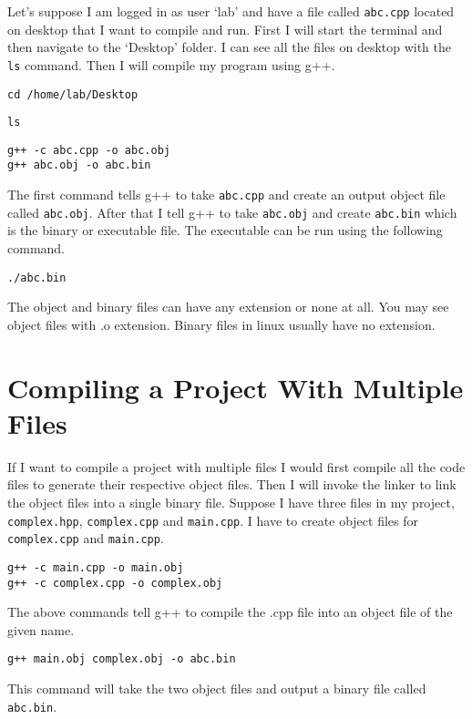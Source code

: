 \documentclass[12pt,a4paper]{article}
\begin{document}
Let's suppose I am logged in as user `lab' and have a file called \verb|abc.cpp| located on desktop that I want to compile and run. First I will start the terminal and then navigate to the `Desktop' folder. I can see all the files on desktop with the \verb|ls| command. Then I will compile my program using g++.
\lstset{breaklines=true, basicstyle=\small\ttfamily, tabsize=4, numbers=none, stepnumber=1, frame=single, showstringspaces=false, upquote=true}
\begin{lstlisting}
cd /home/lab/Desktop
\end{lstlisting}
\begin{lstlisting}
ls
\end{lstlisting}
\begin{lstlisting}
g++ -c abc.cpp -o abc.obj
g++ abc.obj -o abc.bin
\end{lstlisting}
The first command tells g++ to take \verb|abc.cpp| and create an output object file called \verb|abc.obj|. After that I tell g++ to take \verb|abc.obj| and create \verb|abc.bin| which is the binary or executable file. The executable can be run using the following command.
\begin{lstlisting}
./abc.bin
\end{lstlisting}
The object and binary files can have any extension or none at all. You may see object files with .o extension. Binary files in linux usually have no extension.
\section{Compiling a Project With Multiple Files}
If I want to compile a project with multiple files I would first compile all the code files to generate their respective object files. Then I will invoke the linker to link the object files into a single binary file. Suppose I have three files in my project, \verb|complex.hpp|, \verb|complex.cpp| and \verb|main.cpp|. I have to create object files for \verb|complex.cpp| and \verb|main.cpp|.
\begin{lstlisting}
g++ -c main.cpp -o main.obj
g++ -c complex.cpp -o complex.obj
\end{lstlisting}
The above commands tell g++ to compile the .cpp file into an object file of the given name.
\begin{lstlisting}
g++ main.obj complex.obj -o abc.bin
\end{lstlisting}
This command will take the two object files and output a binary file called \verb|abc.bin|.
\end{document}
